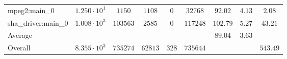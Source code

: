 \begin{tabular}{|l|c|c|c|c|c|c|c|c|}
mpeg2:main\_0           & $ 1.250 \cdot 10^{1} $ & $ 1150   $ & $ 1108  $ & $ 0   $ & $ 32768  $ & $ 92.02       $ & $ 4.13    $ & $ 2.08    $ \\
sha\_driver:main\_0     & $ 1.008 \cdot 10^{3} $ & $ 103563 $ & $ 2585  $ & $ 0   $ & $ 117248 $ & $ 102.79      $ & $ 5.27    $ & $ 43.21   $ \\
\hline
Average                 & $                    $ & $        $ & $       $ & $     $ & $        $ & $ 89.04       $ & $ 3.63    $ & $         $ \\
\hline
Overall                 & $ 8.355 \cdot 10^{3} $ & $ 735274 $ & $ 62813 $ & $ 328 $ & $ 735644 $ & $             $ & $         $ & $ 543.49  $ \\
\hline
\end{tabular}

